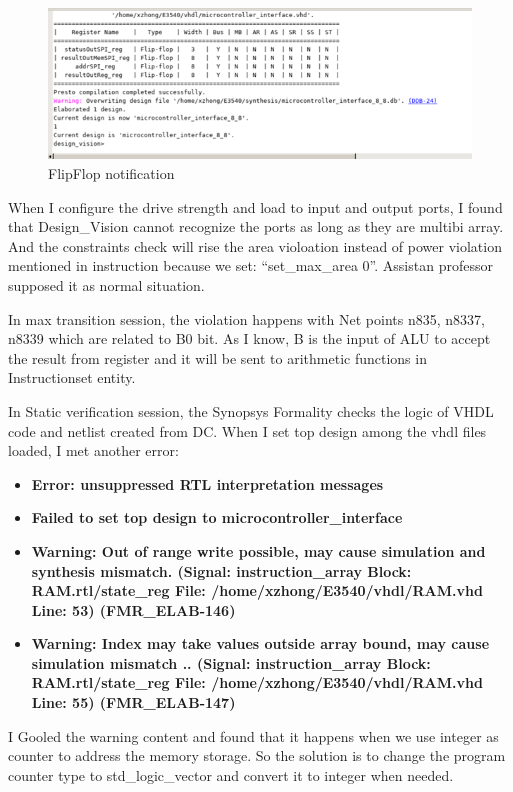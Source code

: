 \begin{figure}[!h]
    \centerline{\includegraphics[width=15cm]{./Figures/elaborationWarning.png}}
    \caption{FlipFlop notification \label{fig3} }
\end{figure}

When I configure the drive strength and load to input and output ports, I found that Design\_Vision cannot recognize the ports as long as 
they are multibi array. And the constraints check will rise the area violoation instead of power violation mentioned in instruction because we set: 
``set\_max\_area 0''. Assistan professor supposed it as normal situation.

In max transition session, the violation happens with Net points n835, n8337, n8339 which are related to B0 bit. As I know, B is the input of
ALU to accept the result from register and it will be sent to arithmetic functions in Instructionset entity. 

In Static verification session, the Synopsys Formality checks the logic of VHDL code and netlist created from DC. 
When I set top design among the vhdl files loaded, I met another error:
\begin{itemize}
\item \textbf{Error: unsuppressed RTL interpretation messages} 
\item \textbf{Failed to set top design to microcontroller\_interface}
\item \textbf{Warning: Out of range write possible, 
may cause simulation and synthesis mismatch. 
(Signal: instruction\_array Block: RAM.rtl/state\_reg File: 
/home/xzhong/E3540/vhdl/RAM.vhd Line: 53) (FMR\_ELAB-146)}
\item \textbf{Warning: Index may take values outside array bound, 
may cause simulation mismatch .. (Signal: instruction\_array Block: RAM.rtl/state\_reg File: 
/home/xzhong/E3540/vhdl/RAM.vhd Line: 55) (FMR\_ELAB-147)}
\end{itemize}

I Gooled the warning content and found that it happens when we use integer as counter to address the memory storage.
So the solution is to change the program counter type to std\_logic\_vector and convert it to integer when needed. 


